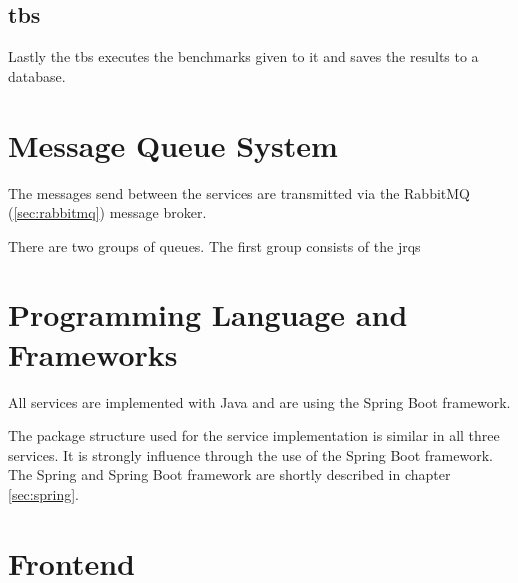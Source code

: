 

\subsection{\acl{tbs}}
\label{sec:ts_benchmarking_service}
Lastly the \ac{tbs} executes the benchmarks given to it and saves the results to a database.



\section{Message Queue System}
\label{sec:message_queue}
The messages send between the services are transmitted via the RabbitMQ (\ref{sec:rabbitmq}) message broker.

There are two groups of queues.
The first group consists of the \aclp{jrq}




\section{Programming Language and Frameworks}
\label{sec:prog_lang_and_framework}
All services are implemented with Java and are using the Spring Boot framework.

The package structure used for the service implementation is similar in all three services.
It is strongly influence through the use of the Spring Boot framework.
The Spring and Spring Boot framework are shortly described in chapter \ref{sec:spring}.
\\





\section{Frontend}
\label{sec:frontend}